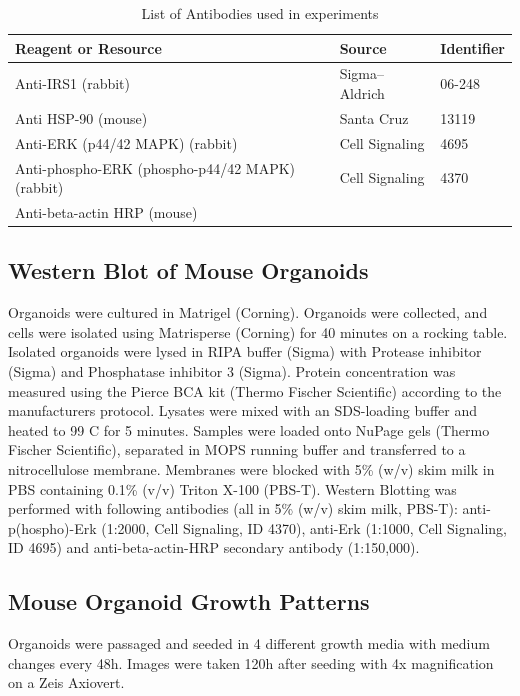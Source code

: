 \begin{flushleft}
\begin{table}[htb]
\caption{List of Antibodies used in experiments}
\label{tab:antibodies} %
\begin{tabularx}{\textwidth}{Xll}
\toprule
\textbf{Reagent or Resource} & \textbf{Source} & \textbf{Identifier} \\
\midrule
Anti-IRS1 (rabbit) & Sigma–Aldrich & 06-248 \\
Anti HSP-90 (mouse) & Santa Cruz & 13119 \\
Anti-ERK (p44/42 MAPK) (rabbit) & Cell Signaling & 4695 \\
Anti-phospho-ERK (phospho-p44/42 MAPK) (rabbit) & Cell Signaling & 4370 \\
Anti-beta-actin HRP (mouse) &  &  \\
\bottomrule
\end{tabularx}
\end{table}

\subsection{Western Blot of Mouse Organoids}
Organoids were cultured in Matrigel (Corning). Organoids were collected, and cells were isolated using Matrisperse (Corning) for 40 minutes on a rocking table. Isolated organoids were lysed in RIPA buffer (Sigma) with Protease inhibitor (Sigma) and Phosphatase inhibitor 3 (Sigma). Protein concentration was measured using the Pierce BCA kit (Thermo Fischer Scientific) according to the manufacturers protocol. Lysates were mixed with an SDS-loading buffer and heated to 99 C for 5 minutes. Samples were loaded onto NuPage gels (Thermo Fischer Scientific), separated in MOPS running buffer and transferred to a nitrocellulose membrane. Membranes were blocked with 5\% (w/v) skim milk in PBS containing 0.1\% (v/v) Triton X-100 (PBS-T). Western Blotting was performed with following antibodies (all in 5\% (w/v) skim milk, PBS-T): anti-p(hospho)-Erk (1:2000, Cell Signaling, ID 4370), anti-Erk (1:1000, Cell Signaling, ID 4695) and anti-beta-actin-HRP secondary antibody (1:150,000).

\subsection{Mouse Organoid Growth Patterns}
Organoids were passaged and seeded in 4 different growth media with medium changes every 48h. Images were taken 120h after seeding with 4x magnification on a Zeis Axiovert. 


\end{flushleft}
